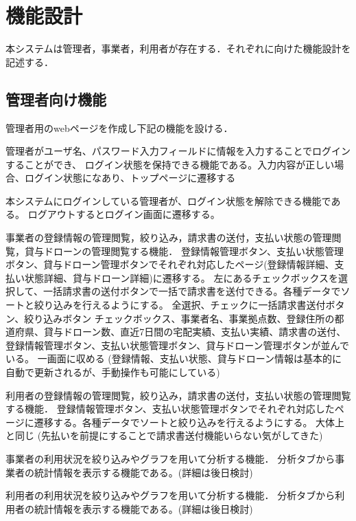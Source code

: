 \documentclass[a4paper, titlepage]{jsarticle}
\begin{document}
\section{機能設計}
本システムは管理者，事業者，利用者が存在する．それぞれに向けた機能設計を記述する．
\subsection{管理者向け機能}
管理者用のwebページを作成し下記の機能を設ける．
\begin{description}[labelwidth=\linewidth]
  \setlength{\leftskip}{1em}
  \item [ログイン機能] 管理者がユーザ名、パスワード入力フィールドに情報を入力することでログインすることができ、
  ログイン状態を保持できる機能である。入力内容が正しい場合、ログイン状態になあり、トップページに遷移する
  \item [ログアウト機能] 本システムにログインしている管理者が、ログイン状態を解除できる機能である。
  ログアウトするとログイン画面に遷移する。
  \item [事業者管理機能]事業者の登録情報の管理閲覧，絞り込み，請求書の送付，支払い状態の管理閲覧，貸与ドローンの管理閲覧する機能．
  登録情報管理ボタン、支払い状態管理ボタン、貸与ドローン管理ボタンでそれぞれ対応したページ(登録情報詳細、支払い状態詳細、貸与ドローン詳細)に遷移する。
  左にあるチェックボックスを選択して、一括請求書の送付ボタンで一括で請求書を送付できる。各種データでソートと絞り込みを行えるようにする。
  全選択、チェックに一括請求書送付ボタン、絞り込みボタン
  チェックボックス、事業者名、事業拠点数、登録住所の都道府県、貸与ドローン数、直近7日間の宅配実績、支払い実績、請求書の送付、登録情報管理ボタン、支払い状態管理ボタン、貸与ドローン管理ボタンが並んでいる。
  一画面に収める
  (登録情報、支払い状態、貸与ドローン情報は基本的に自動で更新されるが、手動操作も可能にしている)

  \item [利用者管理機能]利用者の登録情報の管理閲覧，絞り込み，請求書の送付，支払い状態の管理閲覧する機能．
  登録情報管理ボタン、支払い状態管理ボタンでそれぞれ対応したページに遷移する。各種データでソートと絞り込みを行えるようにする。
  大体上と同じ
  (先払いを前提にすることで請求書送付機能いらない気がしてきた)

  \item [事業者情報分析機能]事業者の利用状況を絞り込みやグラフを用いて分析する機能．
  分析タブから事業者の統計情報を表示する機能である。(詳細は後日検討)

  \item [利用者情報分析機能]利用者の利用状況を絞り込みやグラフを用いて分析する機能．
  分析タブから利用者の統計情報を表示する機能である。(詳細は後日検討)


\end{description}
\end{document}
